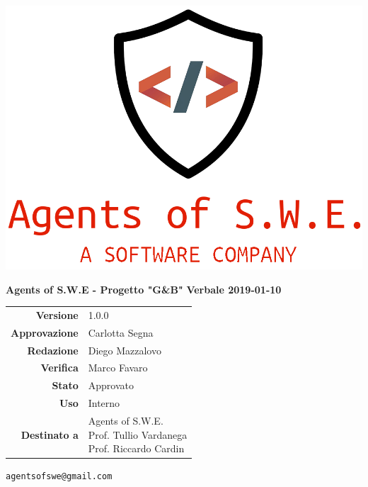 


\begin{titlepage}
\thispagestyle{empty}

\begin{center}


\includegraphics[scale=0.3]{./images/logo.png} 


\large \textbf{Agents of S.W.E - Progetto "G\&B"}
\vfill
\Huge \textbf{Verbale 2019-01-10}
\vfill
\large
\renewcommand{\arraystretch}{1.3}
\begin{tabular}{r|l}
\textbf{Versione} & 1.0.0\\
\textbf{Approvazione} & Carlotta Segna\\
\textbf{Redazione} & \parbox[t]{5cm}{Diego Mazzalovo}\\
\textbf{Verifica} & \parbox[t]{5cm}{Marco Favaro}\\
\textbf{Stato} & Approvato\\
\textbf{Uso} & Interno\\
\textbf{Destinato a} & \parbox[t]{5cm}{Agents of S.W.E. \\Prof. Tullio Vardanega\\Prof. Riccardo Cardin}
\end{tabular}
\vfill
\small
\texttt{agentsofswe@gmail.com}
\end{center}
\end{titlepage}

\pagebreak



\pagebreak


\pagebreak
	

\pagebreak




